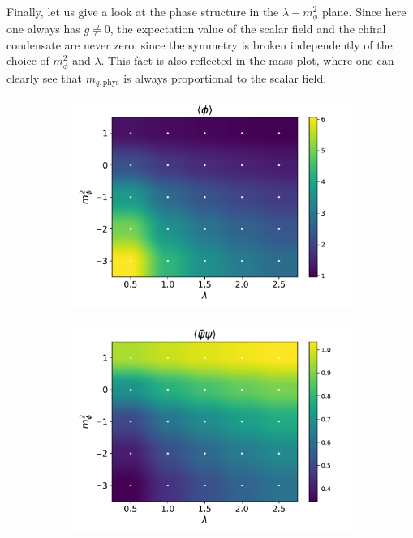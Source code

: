 Finally, let us give a look at the phase structure in the $\lambda - m_\phi^2$ plane. 
Since here one always has $g \neq 0$, the expectation value of the scalar field and the chiral condensate are never zero, since the symmetry is broken independently of the choice of $m_\phi^2$ and $\lambda$. This fact is also reflected in the mass plot,
where one can clearly see that $m_{q,\text{phys}}$ is always proportional to the scalar field.
\begin{figure}[hbp]
    \centering
    \begin{subfigure}[b]{0.47\textwidth}
        \includegraphics[width=\textwidth]{figures/phase_diagram/m-lam/phase_diagram_phi.pdf}
    \end{subfigure}
    \begin{subfigure}[b]{0.47\textwidth}
        \includegraphics[width=\textwidth]{figures/phase_diagram/m-lam/phase_diagram_cond.pdf}

\end{subfigure}
\end{figure}
